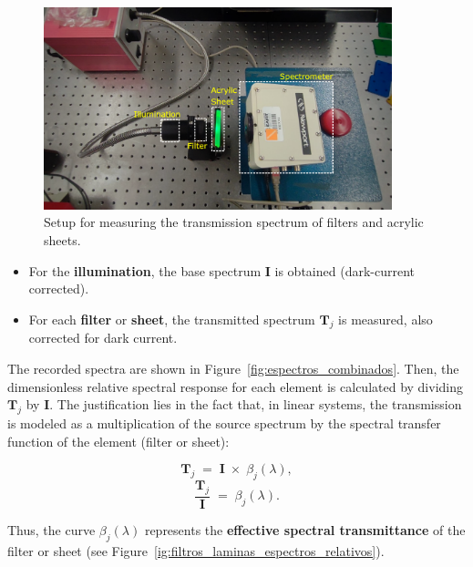 \begin{figure}[h!]
    \centering
    \includegraphics[trim=30mm 0mm 40mm 25mm, clip, width=0.9\textwidth]{Figures/C3/montaje_spec.pdf}
    \caption{Setup for measuring the transmission spectrum of filters and acrylic sheets.}
    \label{fig:montaje_spec}
\end{figure}

\begin{itemize}
    \item For the \textbf{illumination}, the base spectrum \(\mathbf{I}\) is obtained (dark-current corrected).
    \item For each \textbf{filter} or \textbf{sheet}, the transmitted spectrum \(\mathbf{T}_j\) is measured, also corrected for dark current.
\end{itemize}

The recorded spectra are shown in Figure~\ref{fig:espectros_combinados}. Then, the dimensionless relative spectral response for each element is calculated by dividing \(\mathbf{T}_j\) by \(\mathbf{I}\). The justification lies in the fact that, in linear systems, the transmission is modeled as a multiplication of the source spectrum by the spectral transfer function of the element (filter or sheet):

\[
    \mathbf{T}_j \;=\; \mathbf{I} \;\times\; \beta_j(\lambda),
\]
\[
    \frac{\mathbf{T}_j}{\mathbf{I}} \;=\; \beta_j(\lambda).
\]

Thus, the curve \(\beta_j(\lambda)\) represents the \textbf{effective spectral transmittance} of the filter or sheet (see Figure~\ref{ig:filtros_laminas_espectros_relativos}).

